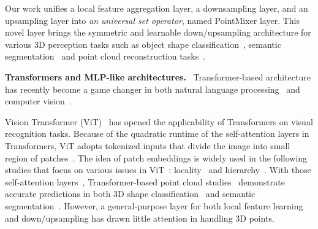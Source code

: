 Our work unifies a local feature aggregation layer, a downsampling layer, and an upsampling layer into \textit{an universal set operator}, named PointMixer layer. This novel layer brings the symmetric and learnable down/upsampling architecture for various 3D perception tasks such as object shape classification~\cite{modelnet40}, semantic segmentation~\cite{armeni_cvpr16} and point cloud reconstruction tasks~\cite{point-recon}.





 











\noindent \textbf{Transformers and MLP-like architectures.} \
Transformer-based architecture has recently become a game changer in both natural language processing~\cite{devlin2019bert,radford2018improving,synthesizer,transformer} and computer vision~\cite{bello2020lambdanetworks,ViT,han2021transformer,liu2021swin,mao2021voxel,ramachandran2019stand,touvron2021training,point-transformer,yuan2021tokens}.


Vision Transformer (ViT)~\cite{ViT} has opened the applicability of Transformers on visual recognition tasks.
Because of the quadratic runtime of the self-attention layers
in Transformers, ViT adopts tokenized inputs that divide the image into small region of patches~\cite{trockman2022patches}. The idea of patch embeddings is widely used in the following studies that focus on various issues in ViT~\cite{khan2021transformers,tay2020efficient}: locality~\cite{ramachandran2019stand,vaswani2021scaling,d2021convit,hu2019local} and hierarchy~\cite{wang2021pyramid,xie2021segformer,liu2021swin,chen2021crossvit}.
With those self-attention layers~\cite{ramachandran2019stand,zhao2020exploring},
Transformer-based point cloud studies~\cite{point-transformer,point-cloud-transformer,cloud-transformer}
demonstrate accurate predictions in both 3D shape classification~\cite{modelnet40} and semantic segmentation~\cite{armeni_cvpr16}. However, a general-purpose layer for both local feature learning and down/upsampling has drawn little attention in handling 3D points.





